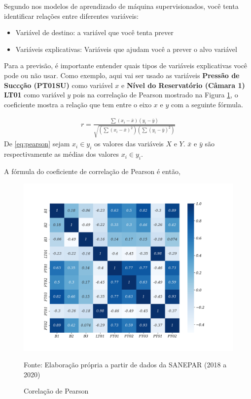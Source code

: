 Segundo  nos modelos de aprendizado de máquina supervisionados, você tenta identificar relações entre diferentes variáveis:

\begin{itemize}
	\item Variável de destino: a variável que você tenta prever
	\item Variáveis explicativas: Variáveis que ajudam você a prever o alvo variável
\end{itemize}

Para a previsão, é importante entender quais tipos de variáveis explicativas você pode ou não usar. Como exemplo, aqui vai ser usado as variáveis \textbf{Pressão de Succção (PT01SU)} como variável $x$ e \textbf{Nível do Reservatório (Câmara 1) LT01} como variável $y$ pois na correlação de Pearson mostrado na Figura \ref{fig:person}, o coeficiente mostra a relação que tem entre o eixo $x$ e $y$ com a seguinte fórmula.



\begin{eqnarray}
	r=\frac{\sum\left(x_i-\bar{x}\right)\left(y_i-\bar{y}\right)}{\sqrt{\left(\sum\left(x_i-\bar{x}\right)^2\right)\left(\sum\left(y_i-\bar{y}\right)^2\right)}}\label{eq:pearson}
\end{eqnarray}
De \eqref{eq:pearson} sejam $x_i \in y_i$ os valores das variáveis $X$ e $Y$.  $\bar{x}$ e $\bar{y}$ são respectivamente as médias dos valores $x_i \in y_i$.

A fórmula do coeficiente de correlação de Pearson é então,

\begin{figure}[H]
	\centering
	\caption{Corelação de Pearson }
	\label{fig:person}
	\includegraphics[width=1\linewidth]{Apendices/Figuras/modelagem-24h/person}
	
	Fonte: Elaboração própria a partir de dados da SANEPAR (2018 a 2020)
\end{figure}

